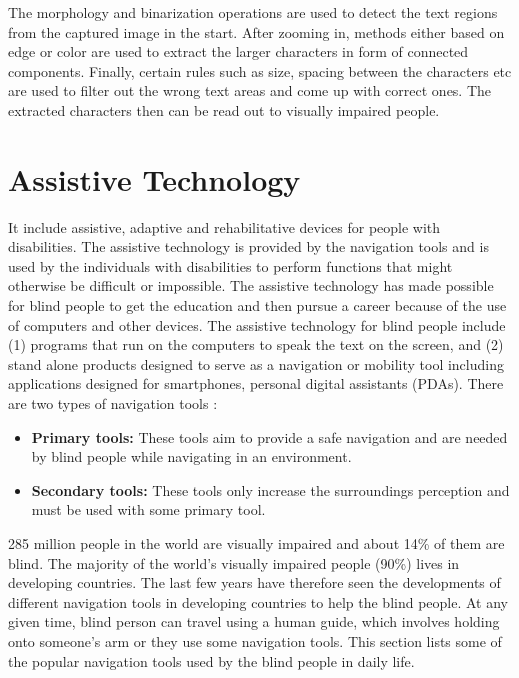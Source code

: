 \begin{itemize}
The morphology and binarization operations 
are used to detect the text regions from the 
captured image in the start. After zooming in, 
methods either based on edge or color are used 
to extract the larger characters in form of connected 
components. Finally, certain rules such as size, spacing 
between the characters etc are used to filter out the wrong 
text areas and come up with correct ones. The extracted 
characters then can be read out to visually impaired people. 
\end{itemize}


\section{Assistive Technology}
\label{sec:technology}
It include assistive, adaptive and rehabilitative devices 
for people with disabilities. The assistive technology is provided 
by the navigation tools and is used by the individuals 
with disabilities to perform functions that might 
otherwise be difficult or impossible.
The assistive technology has made possible for 
blind people to get the education and then pursue a 
career because of the use of computers and other devices.
The assistive technology for blind people include 
(1) programs that run on the computers 
to speak the text on the screen, 
and (2) stand alone products designed to 
serve as a navigation or mobility tool including applications 
designed for smartphones, personal digital assistants 
(PDAs). There are two types of navigation tools :

\begin{itemize}
\item \textbf{Primary tools:}
These tools aim to provide a safe navigation 
and are needed by blind people 
while navigating in an environment. 

\item \textbf{Secondary tools:}
These tools only increase the surroundings 
perception and must be used with some primary 
tool.

\end{itemize}

285 million people in the world are visually impaired 
and about 14\% of them are blind. 
The majority of the world's visually impaired people 
(90\%) lives in developing countries. 
The last few years have therefore seen the developments 
of different navigation tools in developing countries 
to help the blind people. At any given time, 
blind person can travel using a human guide, 
which involves holding onto someone's arm or they 
use some navigation tools.
This section lists some of the popular 
navigation tools 
used by the blind people in daily life.

